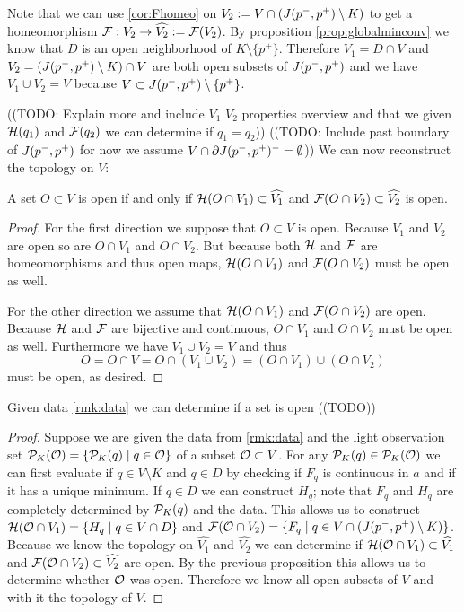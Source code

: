 \begin{remark}
    Note that we can use \ref{cor:Fhomeo} on $V_2:=V\cap (J(p^-,p^+)\setminus K)$ to get a homeomorphism $\mathcal{F}:V_2\to \widehat{V_2}:=\mathcal{F}(V_2)$. By proposition \ref{prop:globalminconv} we know that $D$ is an open neighborhood of $K\setminus \{p^+\}$. Therefore $V_1=D\cap V$ and $V_2=(J(p^-,p^+)\setminus K) \cap V$ are both open subsets of $J(p^-,p^+)$ and we have $V_1 \cup V_2 = V$ because $V\subset J(p^-,p^+) \setminus\{p^+\}$.
\end{remark}
((TODO: Explain more and include $V_1$ $V_2$ properties overview and that we given ${\mathcal{H}}(q_1)$ and $\mathcal{F}(q_2)$ we can determine if $q_1=q_2$))
((TODO: Include past boundary of $J(p^-,p^+)$ for now we assume $V\cap \partial J(p^-,p^+)^-=\emptyset$))
We can now reconstruct the topology on $V$:
\begin{proposition}
    A set $O\subset V$ is open if and only if ${\mathcal{H}}(O\cap V_1)\subset \widehat{V_1}$ and $\mathcal{F}(O\cap V_2)\subset \widehat{V_2}$ is open.
\end{proposition}
\begin{proof}
    For the first direction we suppose that $O\subset V$ is open. Because $V_1$ and $V_2$ are open so are $O\cap V_1$ and $O\cap V_2$. But because both ${\mathcal{H}}$ and $\mathcal{F}$ are homeomorphisms and thus open maps, ${\mathcal{H}}(O\cap V_1)$ and ${\mathcal{F}}(O\cap V_2)$ must be open as well.

    For the other direction we assume that ${\mathcal{H}}(O\cap V_1)$ and ${\mathcal{F}}(O\cap V_2)$ are open. Because ${\mathcal{H}}$ and ${\mathcal{F}}$ are bijective and continuous, $O\cap V_1$ and $O\cap V_2$ must be open as well. Furthermore we have $V_1\cup V_2 = V$ and thus 
    \[
        O = O\cap V = O \cap (V_1\cup V_2) = (O\cap V_1) \cup (O\cap V_2)
    \] must be open, as desired.
\end{proof}

\begin{corollary}
    Given data \ref{rmk:data} we can determine if a set is open ((TODO))
\end{corollary}
\begin{proof}Suppose we are given the data from \ref{rmk:data} and the light observation set ${\mathcal{P}}_K({\mathcal{O}})=\{{\mathcal{P}}_K(q)\mid q\in {\mathcal{O}}\}$ of a subset ${\mathcal{O}}\subset V$. For any ${\mathcal{P}}_K(q)\in {\mathcal{P}}_K({\mathcal{O}})$ we can first evaluate if $q\in V\setminus K$ and $q\in D$ by checking if $F_q$ is continuous in $a$ and if it has a unique minimum. If $q\in D$ we can construct $H_q$; note that $F_q$ and $H_q$ are completely determined by ${\mathcal{P}}_K(q)$ and the data. This allows us to construct ${\mathcal{H}}({\mathcal{O}}\cap V_1)=\{H_q \mid q\in V \cap D\}$ and ${\mathcal{F}}({\mathcal{O}}\cap V_2)=\{F_q \mid q\in V \cap (J(p^-,p^+)\setminus K)\}$. Because we know the topology on $\widehat{V_1}$ and $\widehat{V_2}$ we can determine if ${\mathcal{H}}({\mathcal{O}}\cap V_1)\subset \widehat{V_1}$ and ${\mathcal{F}}({\mathcal{O}}\cap V_2)\subset\widehat{V_2}$ are open. By the previous proposition this allows us to determine whether ${\mathcal{O}}$ was open. Therefore we know all open subsets of $V$ and with it the topology of $V$.
\end{proof}

